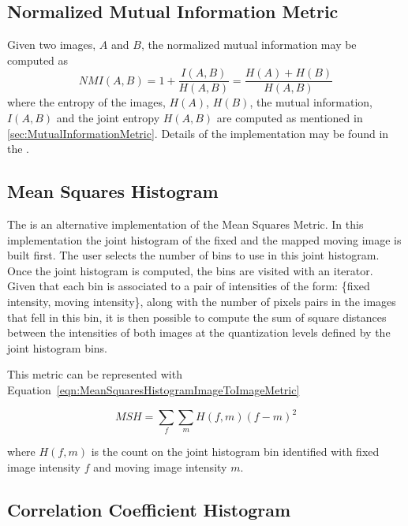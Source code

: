 \subsection{Normalized Mutual Information Metric}
Given two images, $A$ and $B$, the normalized mutual information may be computed as 
\begin{equation}
NMI(A,B) = 1 + \frac{I(A,B)}{H(A,B)} = \frac{H(A) + H(B)}{H(A,B)}
\end{equation}
where the entropy of the images, $H(A)$, $H(B)$, the mutual 
information, $I(A,B)$ and the joint entropy $H(A,B)$ are computed as mentioned 
in \ref{sec:MutualInformationMetric}. Details of the implementation may be found in 
the \cite{Hajnal2001}.

\subsection{Mean Squares Histogram}

The  is an alternative
implementation of the Mean Squares Metric. In this implementation the joint
histogram of the fixed and the mapped moving image is built first. The user
selects the number of bins to use in this joint histogram. Once the joint
histogram is computed, the bins are visited with an iterator. Given that each
bin is associated to a pair of intensities of the form: \{fixed intensity,
moving intensity\}, along with the number of pixels pairs in the images that
fell in this bin, it is then possible to compute the sum of square distances
between the intensities of both images at the quantization levels defined by
the joint histogram bins.

This metric can be represented with
Equation~\ref{eqn:MeanSquaresHistogramImageToImageMetric}

\begin{equation}
\label{eqn:MeanSquaresHistogramImageToImageMetric}
MSH = \sum_f \sum_m { H(f,m) { \left( f - m \right) } ^ 2 }
\end{equation}

where $H(f,m)$ is the count on the joint histogram bin identified with fixed image
intensity $f$ and moving image intensity $m$.


\subsection{Correlation Coefficient Histogram}

